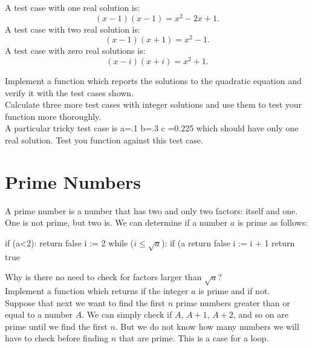 {A test case with one real solution is:
\begin{displaymath}
(x-1)(x-1)= x^2 -2x + 1.
\end{displaymath}
A test case with two real solution is:
\begin{displaymath}
(x-1)(x+1)= x^2 - 1.
\end{displaymath}
A test case with zero real solutions is:
\begin{displaymath}
(x-i)(x+i)= x^2 + 1.
\end{displaymath}

\vskip 0.25cm
\plot Implement a function  which reports the solutions to the quadratic equation and verify it with the test cases shown.\\

\plot Calculate three more test cases with integer solutions and use them to test your function more thoroughly. \\

\plot A particular tricky test case is a=.1 b=.3 c =0.225 which should
have only one real solution.  Test you function against this test case. \\

\section{Prime Numbers}

A prime number is a number that has two and only two factors: itself and one.
One is not prime, but two is.
We can determine if a number $a$ is prime as follows:
\vskip 0.25cm
\begin{algorithm}
  if (a<2):
     return false
  i := 2
  while ($i \leq \sqrt{a}$):   
     if (a%
        return false
     i := i + 1
  return true
\end{algorithm}
\vskip 0.25cm
Why is there no need to check for factors larger than $\sqrt{a}$?\\

\plot Implement a function  which returns 
if the integer $a$ is prime and  if not.\\

Suppose that next we want to find the first $n$ prime numbers greater
than or equal to a number $A$.  We can simply check if $A$, $A+1$,
$A+2$, and so on are prime until we find the first $n$.  But we do not
know how many numbers we will have to check before finding $n$ that
are prime.  This is a case for a  loop.\\

}
